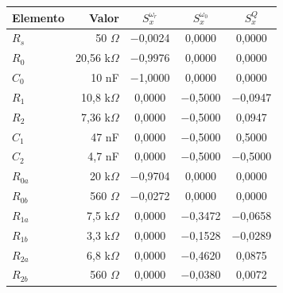 \begin{tabular}{@{}lrccc@{}}
\toprule
Elemento & Valor & $S^{\omega_r}_x$ & $S^{\omega_0}_x$ & $S^{Q}_x$ \\
\midrule
$R_{s}$ & 50 $\Omega$ & $-$0{,}0024 & 0{,}0000 & 0{,}0000 \\
$R_{0}$ & 20,56 k$\Omega$ & $-$0{,}9976 & 0{,}0000 & 0{,}0000 \\
$C_{0}$ & 10 nF & $-$1{,}0000 & 0{,}0000 & 0{,}0000 \\
$R_{1}$ & 10,8 k$\Omega$ & 0{,}0000 & $-$0{,}5000 & $-$0{,}0947 \\
$R_{2}$ & 7,36 k$\Omega$ & 0{,}0000 & $-$0{,}5000 & 0{,}0947 \\
$C_{1}$ & 47 nF & 0{,}0000 & $-$0{,}5000 & 0{,}5000 \\
$C_{2}$ & 4,7 nF & 0{,}0000 & $-$0{,}5000 & $-$0{,}5000 \\
\midrule
$R_{0a}$ & 20 k$\Omega$ & $-$0{,}9704 & 0{,}0000 & 0{,}0000 \\
$R_{0b}$ & 560 $\Omega$ & $-$0{,}0272 & 0{,}0000 & 0{,}0000 \\
$R_{1a}$ & 7,5 k$\Omega$ & 0{,}0000 & $-$0{,}3472 & $-$0{,}0658 \\
$R_{1b}$ & 3,3 k$\Omega$ & 0{,}0000 & $-$0{,}1528 & $-$0{,}0289 \\
$R_{2a}$ & 6,8 k$\Omega$ & 0{,}0000 & $-$0{,}4620 & 0{,}0875 \\
$R_{2b}$ & 560 $\Omega$ & 0{,}0000 & $-$0{,}0380 & 0{,}0072 \\
\bottomrule
\end{tabular}